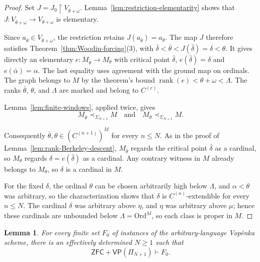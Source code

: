 \documentclass[11pt,a4paper]{amsart}
\newcommand{\VP}{\mathsf{VP}}
\newcommand{\ZFC}{\mathsf{ZFC}}
\newcommand{\Ord}{\mathrm{Ord}}
\newcommand{\rank}{\operatorname{rank}}
\newcommand{\restr}{\mathbin{\upharpoonright}}
\theoremstyle{plain}
\newtheorem{lemma}[theorem]{Lemma}
\theoremstyle{definition}
\theoremstyle{remark}
\begin{document}
\begin{proof}
Set $J=J_0\restr V_{\bar\theta+\omega}$.  Lemma~\ref{lem:restriction-elementarity} shows that $J:V_{\bar\theta+\omega}\longrightarrow V_{\theta+\omega}$ is elementary.

Since $a_{\bar\theta}\in V_{\bar\theta+\omega}$, the restriction retains
$J(a_{\bar\theta})=a_\theta$.  The map $J$ therefore satisfies
Theorem~\ref{thm:Woodin-forcing}(3), with
$\bar\delta<\bar\theta<J(\bar\delta)=\delta<\theta$.
It gives directly an elementary
$e:M_{\bar\theta}\longrightarrow M_\theta$ with critical point
$\bar\delta$, $e(\bar\delta)=\delta$ and $e(\bar\alpha)=\alpha$.
The last equality uses agreement with the ground map on ordinals.
The graph belongs to $M$ by the theorem's bound
$\rank(e)<\theta+\omega<\Lambda$.
The ranks $\bar\theta$, $\theta$, and $\Lambda$ are marked and belong
to $C^{(r)}$.

Lemma~\ref{lem:finite-windows}, applied twice, gives
\[
M_{\bar\theta}\prec_{\Sigma_{N+1}}M
\quad\text{and}\quad
M_\theta\prec_{\Sigma_{N+1}}M.
\]

Consequently $\bar\theta,\theta\in(C^{(n+1)})^M$ for every $n\leq N$.  As in the proof of Lemma~\ref{lem:rank-Berkeley-descent}, $M_{\bar\theta}$ regards the critical point $\bar\delta$ as a cardinal, so $M_\theta$ regards $\delta=e(\bar\delta)$ as a cardinal.  Any contrary witness in $M$ already belongs to $M_\theta$, so $\delta$ is a cardinal in $M$.

For the fixed $\delta$, the ordinal $\theta$ can be chosen arbitrarily high below $\Lambda$, and $\alpha<\theta$ was arbitrary, so the characterization shows that $\delta$ is $C^{(n)}$-extendible for every $n\leq N$.  The cardinal $\delta$ was arbitrary above $\eta$, and $\eta$ was arbitrary above $\mu$; hence these cardinals are unbounded below $\Lambda=\Ord^M$, so each class is proper in $M$.
\end{proof}

\begingroup

\begin{lemma}\label{lem:finite-language-reduction}
For every finite set $F_0$ of instances of the arbitrary-language Vop\v{e}nka scheme, there is an effectively determined $N\geq1$ such that
\[
\ZFC+\VP(\Pi_{N+1})\vdash F_0.
\]
\end{lemma}
\end{document}

